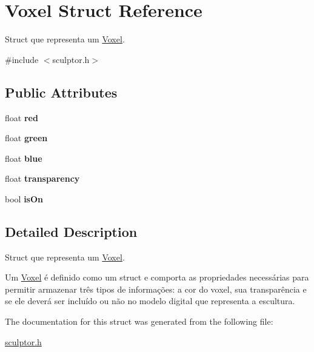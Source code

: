 \hypertarget{structVoxel}{}\section{Voxel Struct Reference}
\label{structVoxel}


Struct que representa um \mbox{\hyperlink{structVoxel}{Voxel}}.  




{\ttfamily \#include $<$sculptor.\+h$>$}

\subsection*{Public Attributes}
\begin{DoxyCompactItemize}
\item 
\mbox{\label{structVoxel_af8715c373730c8f0bfe5df46dc376708}} 
float {\bfseries red}
\item 
\mbox{\label{structVoxel_aac0e7870d454df5817b5516bb293a33e}} 
float {\bfseries green}
\item 
\mbox{\label{structVoxel_a78da493d12803794ee78ae077720c14d}} 
float {\bfseries blue}
\item 
\mbox{\label{structVoxel_a2c892d1f8ba3b2dc1e5bb463c783d5ed}} 
float {\bfseries transparency}
\item 
\mbox{\label{structVoxel_a6fbe8bd53f64685ac4210726d40fc775}} 
bool {\bfseries is\+On}
\end{DoxyCompactItemize}


\subsection{Detailed Description}
Struct que representa um \mbox{\hyperlink{structVoxel}{Voxel}}. 

Um \mbox{\hyperlink{structVoxel}{Voxel}} é definido como um struct e comporta as propriedades necessárias para permitir armazenar três tipos de informações\+: a cor do voxel, sua transparência e se ele deverá ser incluído ou não no modelo digital que representa a escultura. 

The documentation for this struct was generated from the following file\+:\begin{DoxyCompactItemize}
\item 
\mbox{\hyperlink{sculptor_8h}{sculptor.\+h}}\end{DoxyCompactItemize}
